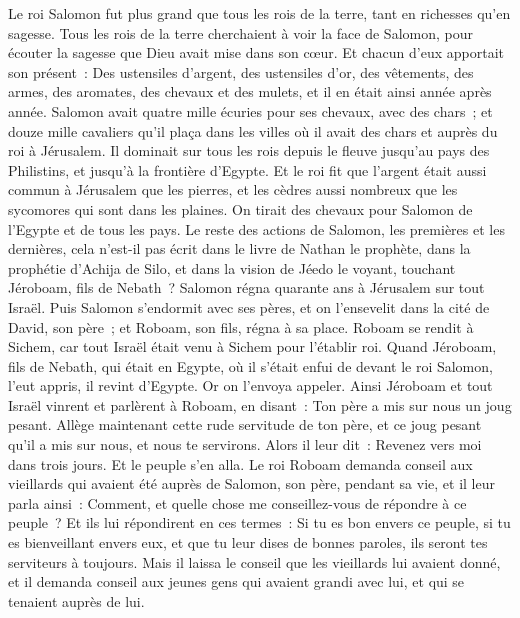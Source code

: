 \begin{multicols}{2}
Le roi Salomon fut plus grand que tous les rois de la terre, tant en richesses qu'en sagesse.
Tous les rois de la terre cherchaient à voir la face de Salomon, pour écouter la sagesse que Dieu avait mise dans son cœur.
Et chacun d'eux apportait son présent~: Des ustensiles d'argent, des ustensiles d'or, des vêtements, des armes, des aromates, des chevaux et des mulets, et il en était ainsi année après année.
Salomon avait quatre mille écuries pour ses chevaux, avec des chars~; et douze mille cavaliers qu'il plaça dans les villes où il avait des chars et auprès du roi à Jérusalem.
Il dominait sur tous les rois depuis le fleuve jusqu'au pays des Philistins, et jusqu'à la frontière d'Egypte.
Et le roi fit que l'argent était aussi commun à Jérusalem que les pierres, et les cèdres aussi nombreux que les sycomores qui sont dans les plaines.
On tirait des chevaux pour Salomon de l'Egypte et de tous les pays.
Le reste des actions de Salomon, les premières et les dernières, cela n'est-il pas écrit dans le livre de Nathan le prophète, dans la prophétie d'Achija de Silo, et dans la vision de Jéedo le voyant, touchant Jéroboam, fils de Nebath~?
Salomon régna quarante ans à Jérusalem sur tout Israël.
Puis Salomon s'endormit avec ses pères, et on l'ensevelit dans la cité de David, son père~; et Roboam, son fils, régna à sa place.
\VerseOne{}Roboam se rendit à Sichem, car tout Israël était venu à Sichem pour l'établir roi.
Quand Jéroboam, fils de Nebath, qui était en Egypte, où il s'était enfui de devant le roi Salomon, l'eut appris, il revint d'Egypte.
Or on l'envoya appeler. Ainsi Jéroboam et tout Israël vinrent et parlèrent à Roboam, en disant~:
Ton père a mis sur nous un joug pesant. Allège maintenant cette rude servitude de ton père, et ce joug pesant qu'il a mis sur nous, et nous te servirons.
Alors il leur dit~: Revenez vers moi dans trois jours. Et le peuple s'en alla.
Le roi Roboam demanda conseil aux vieillards qui avaient été auprès de Salomon, son père, pendant sa vie, et il leur parla ainsi~: Comment, et quelle chose me conseillez-vous de répondre à ce peuple~?
 Et ils lui répondirent en ces termes~: Si tu es bon envers ce peuple, si tu es bienveillant envers eux, et que tu leur dises de bonnes paroles, ils seront tes serviteurs à toujours.
Mais il laissa le conseil que les vieillards lui avaient donné, et il demanda conseil aux jeunes gens qui avaient grandi avec lui, et qui se tenaient auprès de lui.

\end{multicols}
